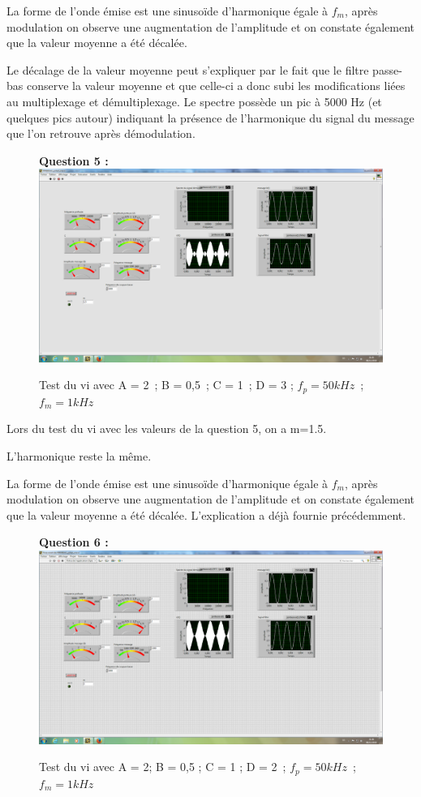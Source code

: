 \documentclass[french, a4paper,12pt, titlepage]{article}
\begin{document}
	La forme de l'onde émise est une sinusoïde d'harmonique égale à $f_m$, après modulation on observe une augmentation de l'amplitude
	et on constate également que la valeur moyenne a été décalée.

	Le décalage de la valeur moyenne peut s'expliquer par le fait que le filtre passe-bas conserve la valeur moyenne et que celle-ci a donc
	subi les modifications liées au multiplexage et démultiplexage.
	Le spectre possède un pic à 5000 Hz (et quelques pics autour) indiquant la présence de l'harmonique du signal du message que
	l’on retrouve après démodulation.

\begin{figure}[!h]
	\textbf{Question 5 : \\ }
	\includegraphics[width=\textwidth]{question5.png}
	\caption{Test du vi avec  A = 2 ; B = 0,5 ; C = 1 ; D = 3 ; $f_p = 50kHz$ ; $f_m = 1kHz$}
\end{figure}

Lors du test du vi avec les valeurs de la question 5, on a m=1.5.

L'harmonique reste la même.

La forme de l'onde émise est une sinusoïde d'harmonique égale à $f_m$, après modulation on observe une augmentation de l'amplitude
et on constate également que la valeur moyenne a été décalée.
L'explication a déjà fournie précédemment.

\newpage

\begin{figure}[!h]
	\textbf{Question 6 : \\ }
	\includegraphics[width=\textwidth]{question6.png}
	\caption{ Test du vi avec A = 2; B = 0,5 ; C = 1 ; D = 2 ; $f_p = 50kHz$ ; $f_m = 1kHz$  }
\end{figure}
\end{document}
